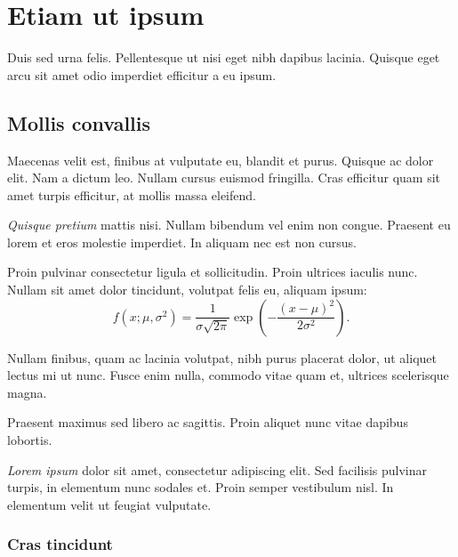 

\chapter{Etiam ut ipsum}

Duis sed urna felis. Pellentesque ut nisi eget nibh dapibus lacinia. Quisque eget arcu sit amet odio imperdiet efficitur a eu ipsum.

\section{Mollis convallis}

Maecenas velit est, finibus at vulputate eu, blandit et purus. Quisque ac dolor elit. Nam a dictum leo. Nullam cursus euismod fringilla. Cras efficitur quam sit amet turpis efficitur, at mollis massa eleifend.

\begin{definition}
    \emph{Quisque pretium} mattis nisi. Nullam bibendum vel enim non congue. Praesent eu lorem et eros molestie imperdiet. In aliquam nec est non cursus. \cite[p.~72]{doloremIpsumQuia}
\end{definition}

Proin pulvinar consectetur ligula et sollicitudin. Proin ultrices iaculis nunc. Nullam sit amet dolor tincidunt, volutpat felis eu, aliquam ipsum: \[f(x; \mu, \sigma^2) = \frac{1}{\sigma \sqrt{2\pi}} \exp\left( -\frac{(x - \mu)^2}{2\sigma^2} \right)\text{.}\]

Nullam finibus, quam ac lacinia volutpat, nibh purus placerat dolor, ut aliquet lectus mi ut nunc. Fusce enim nulla, commodo vitae quam et, ultrices scelerisque magna.

\begin{proposition}
    Praesent maximus sed libero ac sagittis. Proin aliquet nunc vitae dapibus lobortis.
\end{proposition}

\emph{Lorem ipsum} dolor sit amet, consectetur adipiscing elit. Sed facilisis pulvinar turpis, in elementum nunc sodales et. Proin semper vestibulum nisl. In elementum velit ut feugiat vulputate. \cite{consecteturDdipiscing}

\subsection{Cras tincidunt}

